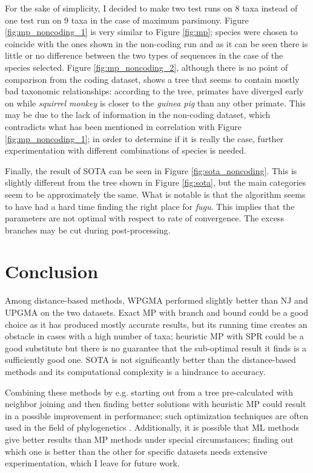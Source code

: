 \documentclass[11pt,twocolumn]{article}
\begin{document}
For the sake of simplicity, I decided to make two test runs on 8 taxa instead of one test run on 9 taxa in the case of maximum parsimony. Figure \ref{fig:mp_noncoding_1} is very similar to Figure \ref{fig:mp}; species were chosen to coincide with the ones shown in the non-coding run and as it can be seen there is little or no difference between the two types of sequences in the case of the species selected. Figure \ref{fig:mp_noncoding_2}, although there is no point of comparison from the coding dataset, shows a tree that seems to contain mostly bad taxonomic relationships: according to the tree, primates have diverged early on while \textit{squirrel monkey} is closer to the \textit{guinea pig} than any other primate. This may be due to the lack of information in the non-coding dataset, which contradicts what has been mentioned in correlation with Figure \ref{fig:mp_noncoding_1}; in order to determine if it is really the case, further experimentation with different combinations of species is needed.

Finally, the result of SOTA can be seen in Figure \ref{fig:sota_noncoding}. This is slightly different from the tree shown in Figure \ref{fig:sota}, but the main categories seem to be approximately the same. What is notable is that the algorithm seems to have had a hard time finding the right place for \textit{fugu}. This implies that the parameters are not optimal with respect to rate of convergence. The excess branches may be cut during post-processing.

\section{Conclusion}

Among distance-based methods, WPGMA performed slightly better than NJ and UPGMA on the two datasets. Exact MP with branch and bound could be a good choice as it has produced mostly accurate results, but its running time creates an obstacle in cases with a high number of taxa; heuristic MP with SPR could be a good substitute but there is no guarantee that the sub-optimal result it finds is a sufficiently good one. SOTA is not significantly better than the distance-based methods and its computational complexity is a hindrance to accuracy.

Combining these methods by e.g. starting out from a tree pre-calculated with neighbor joining and then finding better solutions with heuristic MP could result in a possible improvement in performance; such optimization techniques are often used in the field of phylogenetics \cite{Zvelebil2007}. Additionally, it is possible that ML methods give better results than MP methods under special circumstances; finding out which one is better than the other for specific datasets needs extensive experimentation, which I leave for future work.
\end{document}
